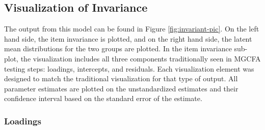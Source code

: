 \documentclass[
  man]{apa6}
\newenvironment{Shaded}{\begin{snugshade}}{\end{snugshade}}
\newcommand{\AttributeTok}[1]{\textcolor[rgb]{0.77,0.63,0.00}{#1}}
\newcommand{\CommentTok}[1]{\textcolor[rgb]{0.56,0.35,0.01}{\textit{#1}}}
\newcommand{\DecValTok}[1]{\textcolor[rgb]{0.00,0.00,0.81}{#1}}
\newcommand{\FunctionTok}[1]{\textcolor[rgb]{0.00,0.00,0.00}{#1}}
\newcommand{\NormalTok}[1]{#1}
\newcommand{\SpecialCharTok}[1]{\textcolor[rgb]{0.00,0.00,0.00}{#1}}
\newcommand{\StringTok}[1]{\textcolor[rgb]{0.31,0.60,0.02}{#1}}
\begin{document}
\begin{Shaded}
\end{Shaded}

\normalsize

\hypertarget{visualization-of-invariance}{%
\subsection{Visualization of Invariance}\label{visualization-of-invariance}}

The output from this model can be found in Figure \ref{fig:invariant-pic}. On the left hand side, the item invariance is plotted, and on the right hand side, the latent mean distributions for the two groups are plotted. In the item invariance sub-plot, the visualization includes all three components traditionally seen in MGCFA testing steps: loadings, intercepts, and residuals. Each visualization element was designed to match the traditional visualization for that type of output. All parameter estimates are plotted on the unstandardized estimates and their confidence interval based on the standard error of the estimate.

\hypertarget{loadings}{%
\subsubsection{Loadings}\label{loadings}}
\end{document}
